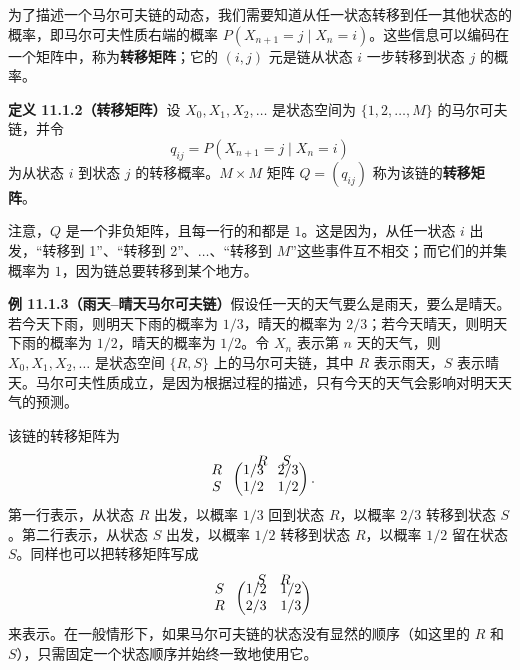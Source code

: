 \documentclass[UTF8,12pt,a4paper,fontset=fandol]{ctexart}
\begin{document}
为了描述一个马尔可夫链的动态，我们需要知道从任一状态转移到任一其他状态的概率，即马尔可夫性质右端的概率 $P(X_{n+1}=j\mid X_n=i)$。这些信息可以编码在一个矩阵中，称为\textbf{转移矩阵}；它的 $(i,j)$ 元是链从状态 $i$ 一步转移到状态 $j$ 的概率。

\noindent\textbf{定义 11.1.2（转移矩阵）}\quad 设 $X_0,X_1,X_2,\ldots$ 是状态空间为 $\{1,2,\ldots,M\}$ 的马尔可夫链，并令
\[
  q_{ij}=P(X_{n+1}=j\mid X_n=i)
\]
为从状态 $i$ 到状态 $j$ 的转移概率。$M\times M$ 矩阵 $Q=(q_{ij})$ 称为该链的\textbf{转移矩阵}。

注意，$Q$ 是一个非负矩阵，且每一行的和都是 $1$。这是因为，从任一状态 $i$ 出发，“转移到 1”、“转移到 2”、$\ldots$、“转移到 $M$”这些事件互不相交；而它们的并集概率为 $1$，因为链总要转移到某个地方。

\noindent\textbf{例 11.1.3（雨天--晴天马尔可夫链）}\quad 假设任一天的天气要么是雨天，要么是晴天。若今天下雨，则明天下雨的概率为 $1/3$，晴天的概率为 $2/3$；若今天晴天，则明天下雨的概率为 $1/2$，晴天的概率为 $1/2$。令 $X_n$ 表示第 $n$ 天的天气，则 $X_0,X_1,X_2,\ldots$ 是状态空间 $\{R,S\}$ 上的马尔可夫链，其中 $R$ 表示雨天，$S$ 表示晴天。马尔可夫性质成立，是因为根据过程的描述，只有今天的天气会影响对明天天气的预测。

该链的转移矩阵为
\[
\begin{array}{c@{\;}c}
 & \begin{array}{cc} R & S \end{array}\\[-2mm]
\begin{array}{c} R\\ S \end{array}
&
\begin{pmatrix}
  1/3 & 2/3\\
  1/2 & 1/2
\end{pmatrix}.
\end{array}
\]
第一行表示，从状态 $R$ 出发，以概率 $1/3$ 回到状态 $R$，以概率 $2/3$ 转移到状态 $S$。第二行表示，从状态 $S$ 出发，以概率 $1/2$ 转移到状态 $R$，以概率 $1/2$ 留在状态 $S$。同样也可以把转移矩阵写成
\[
\begin{array}{c@{\;}c}
 & \begin{array}{cc} S & R \end{array}\\[-2mm]
\begin{array}{c} S\\ R \end{array}
&
\begin{pmatrix}
  1/2 & 1/2\\
  2/3 & 1/3
\end{pmatrix}
\end{array}
\]
来表示。在一般情形下，如果马尔可夫链的状态没有显然的顺序（如这里的 $R$ 和 $S$），只需固定一个状态顺序并始终一致地使用它。
\end{document}
